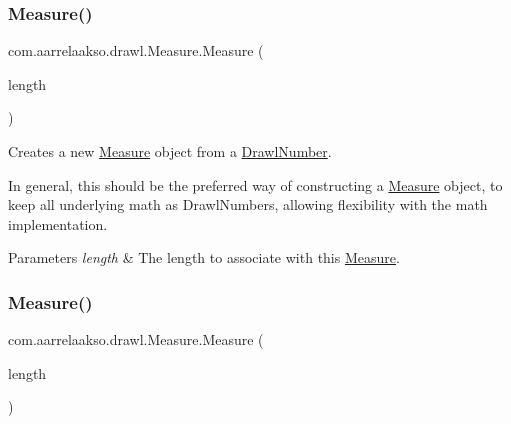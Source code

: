\subsubsection{\texorpdfstring{Measure()}{Measure()}\hspace{0.1cm}{\footnotesize\ttfamily [1/2]}}
{\footnotesize\ttfamily com.\+aarrelaakso.\+drawl.\+Measure.\+Measure (\begin{DoxyParamCaption}\item[{final \hyperlink{interfacecom_1_1aarrelaakso_1_1drawl_1_1_number}{Number}}]{length }\end{DoxyParamCaption})\hspace{0.3cm}{\ttfamily [protected]}}



Creates a new \hyperlink{classcom_1_1aarrelaakso_1_1drawl_1_1_measure}{Measure} object from a \hyperlink{classcom_1_1aarrelaakso_1_1drawl_1_1_drawl_number}{Drawl\+Number}. 

In general, this should be the preferred way of constructing a \hyperlink{classcom_1_1aarrelaakso_1_1drawl_1_1_measure}{Measure} object, to keep all underlying math as Drawl\+Numbers, allowing flexibility with the math implementation.


\begin{DoxyParams}{Parameters}
{\em length} & The length to associate with this \hyperlink{classcom_1_1aarrelaakso_1_1drawl_1_1_measure}{Measure}. \\
\hline
\end{DoxyParams}
\mbox{\label{classcom_1_1aarrelaakso_1_1drawl_1_1_measure_a1960447b4b9dc0f4e71a2b86af31c52c}} 
\subsubsection{\texorpdfstring{Measure()}{Measure()}\hspace{0.1cm}{\footnotesize\ttfamily [2/2]}}
{\footnotesize\ttfamily com.\+aarrelaakso.\+drawl.\+Measure.\+Measure (\begin{DoxyParamCaption}\item[{@Not\+Null final Integer}]{length }\end{DoxyParamCaption})}



